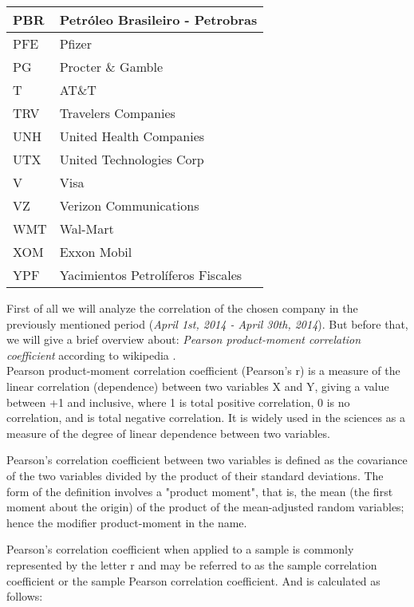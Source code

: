 \begin{table}
\begin{tabular}{ | p{3cm\textwidth} | p{7cm\textwidth} |}
PBR    & Petróleo Brasileiro - Petrobras   \\\hline
PFE    & Pfizer                            \\\hline
PG     & Procter \& Gamble                 \\\hline
T      & AT\&T                             \\\hline
TRV    & Travelers Companies               \\\hline
UNH    & United Health Companies           \\\hline
UTX    & United Technologies Corp          \\\hline
V      & Visa                              \\\hline
VZ     & Verizon Communications            \\\hline
WMT    & Wal-Mart                          \\\hline
XOM    & Exxon Mobil                       \\\hline
YPF    & Yacimientos Petrolíferos Fiscales \\\hline

    \end{tabular}
\end{table}

First of all we will analyze the correlation of the chosen company in the previously mentioned period (\emph{April 1st, 2014 - April 30th, 2014}). But before that, we will give a brief overview about: \emph{Pearson product-moment correlation coefficient} according to wikipedia \cite{PP2014}.
\\
 Pearson product-moment correlation coefficient (Pearson's r) is a measure of the linear correlation (dependence) between two variables X and Y, giving a value between +1 and  inclusive, where 1 is total positive correlation, 0 is no correlation, and  is total negative correlation. It is widely used in the sciences as a measure of the degree of linear dependence between two variables.

Pearson's correlation coefficient between two variables is defined as the covariance of the two variables divided by the product of their standard deviations. The form of the definition involves a "product moment", that is, the mean (the first moment about the origin) of the product of the mean-adjusted random variables; hence the modifier product-moment in the name.

Pearson's correlation coefficient when applied to a sample is commonly represented by the letter r and may be referred to as the sample correlation coefficient or the sample Pearson correlation coefficient. And is calculated as follows: 

